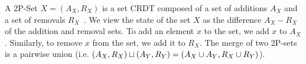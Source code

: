 %

A 2P-Set $X = (A_X, R_X)$ is a set CRDT composed of a set of additions $A_X$
and a set of removals $R_X$~\cite{shapiro2011comprehensive}. We view the state
of the set $X$ as the difference $A_X - R_X$ of the addition and removal sets.
To add an element $x$ to the set, we add $x$ to $A_X$. Similarly, to remove $x$
from the set, we add it to $R_X$. The merge of two 2P-sets is a pairwise union
(i.e. $(A_X, R_X) \sqcup (A_Y, R_Y) = (A_X \cup A_Y, R_X \cup R_Y)$).

